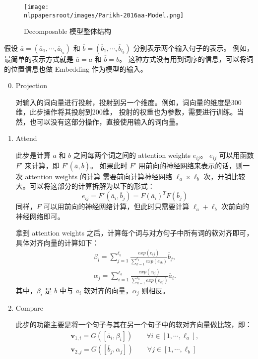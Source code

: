 \begin{figure}[H]
  \centering
  \texttt{[image: \\nlppapersroot/images/Parikh-2016aa-Model.png]}
  \caption{Decomposable 模型整体结构}
  \label{fig:Parikh-2016aa-Model}
\end{figure}

假设 $\overline{a} = (\overline{a}_1, \cdots, \overline{a}_{l_a})$ 和
$\overline{b} = (\overline{b}_1, \cdots, \overline{b}_{l_b})$ 分别表示两个输入句子的表示。
例如，最简单的表示方式就是 $\overline{a} = a$ 和 $\overline{b} = b$。
这种方式没有用到词序的信息，可以将词的位置信息也做 Embedding 作为模型的输入。

\begin{enumerate}
    \setcounter{enumi}{-1}
    \item Projection

        对输入的词向量进行投射，投射到另一个维度。例如，词向量的维度是300维，此步操作将其投射到200维，
        投射的权重也为参数，需要进行训练。当然，也可以没有这部分操作，直接使用输入的词向量。

    \item Attend

        此步是计算 $a$ 和 $b$ 之间每两个词之间的 attention weights $e_{ij}$。
        $e_{ij}$ 可以用函数 $F'$ 来计算，即 $F'(\overline{a}, \overline{b})$。
        如果此时 $F'$ 用前向的神经网络来表示的话，则一次 attention weights 的计算
        需要前向计算神经网络 $\ell_a \times \ell_b$ 次，开销比较大。可以将这部分的计算拆解为以下的形式：
        \[
            e_{ij} = F'(\overline{a}_i, \overline{b}_j) = F(\overline{a}_i)^{T} F(\overline{b}_j)
        \]
        同样，$F$ 可以用前向的神经网络计算，但此时只需要计算 $\ell_a + \ell_b$ 次前向的神经网络即可。

        拿到 attention weights 之后，计算每个词与对方句子中所有词的软对齐即可，具体对齐向量的计算如下：
        \begin{align*}
            \beta_i = \sum_{j=1}^{\ell_b} \frac{exp(e_{ij})}{\sum_{k=1}^{\ell_b}{exp(e_{ik})}} \overline{b}_j , \\
            \alpha_j = \sum_{i=1}^{\ell_a} \frac{exp(e_{ij})}{\sum_{k=1}^{\ell_a}{exp(e_{kj})}} \overline{a}_i.
        \end{align*}
        其中，$\beta_i$ 是 $\overline{b}$ 中与 $\overline{a}_i$ 软对齐的向量，$\alpha_j$ 则相反。

    \item Compare

        此步的功能主要是将一个句子与其在另一个句子中的软对齐向量做比较，即：
        \begin{align*}
            \mathbf{v}_{1,i} = G([\overline{a}_i, \beta_i]) \qquad \forall i \in [1, \cdots, \ell_a], \\
            \mathbf{v}_{2,j} = G([\overline{b}_j, \alpha_j]) \qquad \forall j \in [1, \cdots, \ell_b]
        \end{align*}


\end{enumerate}

